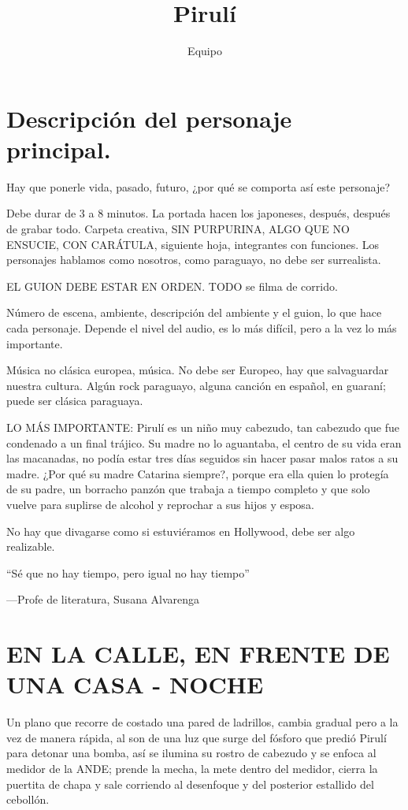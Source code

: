 \documentclass[12pt, a4paper]{article}
\title{Pirulí}
\author{Equipo}
\begin{document}
  \maketitle


  \section*{Descripción del personaje principal.}

  Hay que ponerle vida, pasado, futuro, ¿por qué se comporta así este personaje?


  Debe durar de 3 a 8 minutos.
  La portada hacen los japoneses, después, después de grabar todo. Carpeta creativa, SIN PURPURINA, ALGO QUE NO ENSUCIE, CON CARÁTULA,
  siguiente hoja, integrantes con funciones. Los personajes hablamos como nosotros, como paraguayo, no debe ser surrealista. 

  EL GUION DEBE ESTAR EN ORDEN. TODO se filma de corrido. 

  Número de escena, ambiente, descripción del ambiente y el guion, lo que hace cada personaje. Depende el nivel del audio, es lo más difícil, pero a la vez lo más 
  importante. 

  Música no clásica europea, música. No debe ser Europeo, hay que salvaguardar nuestra cultura. Algún rock paraguayo, alguna canción en español, 
  en guaraní; puede ser clásica paraguaya. 

  \vspace{7pt}
  LO MÁS IMPORTANTE: Pirulí es un niño muy cabezudo, tan cabezudo que fue condenado a un final trájico. Su madre no lo aguantaba, el centro de su vida
  eran las macanadas, no podía estar tres días seguidos sin hacer pasar malos ratos a su madre. ¿Por qué su madre Catarina siempre?,
  porque era ella quien lo protegía de su padre, un borracho panzón que trabaja a tiempo completo y que solo vuelve para suplirse de 
  alcohol y reprochar a sus hijos y esposa.

  No hay que divagarse como si estuviéramos en Hollywood, debe ser algo realizable.


  \hfill\begin{minipage}{0.55\linewidth}
  ``Sé que no hay tiempo, pero igual no hay tiempo''

  ---Profe de literatura, Susana Alvarenga
  \end{minipage}

  \section{EN LA CALLE, EN FRENTE DE UNA CASA - NOCHE}
  Un plano que recorre de costado una pared de ladrillos, cambia gradual pero a la vez de manera rápida, al son de una luz que surge del fósforo
  que predió Pirulí para detonar una bomba, así se ilumina su rostro de cabezudo y se enfoca al medidor de la ANDE;
  prende la mecha, la mete dentro del medidor, cierra la puertita de chapa y sale corriendo al desenfoque y del posterior estallido del cebollón.
\end{document}
